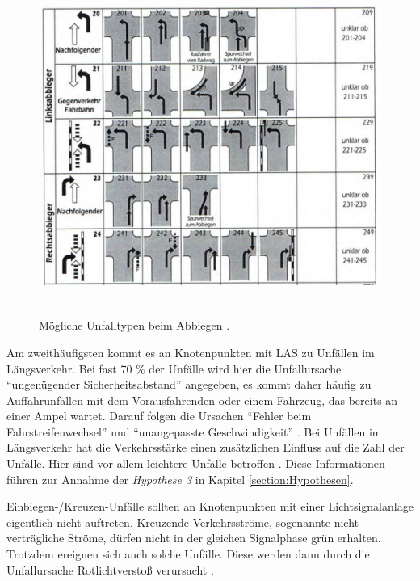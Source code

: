 \begin{savenotes}
	\begin{figure}[H]
		\centering
		\includegraphics[width=13cm,height=11cm]{figures/Abbiege-Unfall}
		\caption[Unfalltyp 2 Abbiege-Unfall]{Mögliche Unfalltypen beim Abbiegen \parencite[S. 11]{GesamtverbandderDeutschenVersicherungswirtschafte.V..2016}. }\label{fig:Abbiege-Unfall}
	\end{figure}
\end{savenotes}

Am zweithäufigsten kommt es an Knotenpunkten mit LAS zu Unfällen im Längsverkehr. Bei fast 70 \% der Unfälle wird hier die Unfallursache \enquote{ungenügender Sicherheitsabstand} angegeben, es kommt daher häufig zu Auffahrunfällen mit dem Vorausfahrenden oder einem Fahrzeug, das bereits an einer Ampel wartet. Darauf folgen die Ursachen \enquote{Fehler beim Fahrstreifenwechsel} und \enquote{unangepasste Geschwindigkeit} \parencite[S. 273]{Schreiber.2016}. Bei Unfällen im Längsverkehr hat die Verkehrsstärke einen zusätzlichen Einfluss auf die Zahl der Unfälle. Hier sind vor allem leichtere Unfälle betroffen \parencite[S. 86]{Aurich.2015}. Diese Informationen führen zur Annahme der \textit{Hypothese 3} in Kapitel \ref{section:Hypothesen}.

Einbiegen-/Kreuzen-Unfälle sollten an Knotenpunkten mit einer Lichtsignalanlage eigentlich nicht auftreten. Kreuzende Verkehrsströme, sogenannte nicht verträgliche Ströme, dürfen nicht in der gleichen Signalphase grün erhalten. Trotzdem ereignen sich auch solche Unfälle. Diese werden dann durch die Unfallursache Rotlichtverstoß verursacht \parencite[S. 274]{Schreiber.2016}. 


